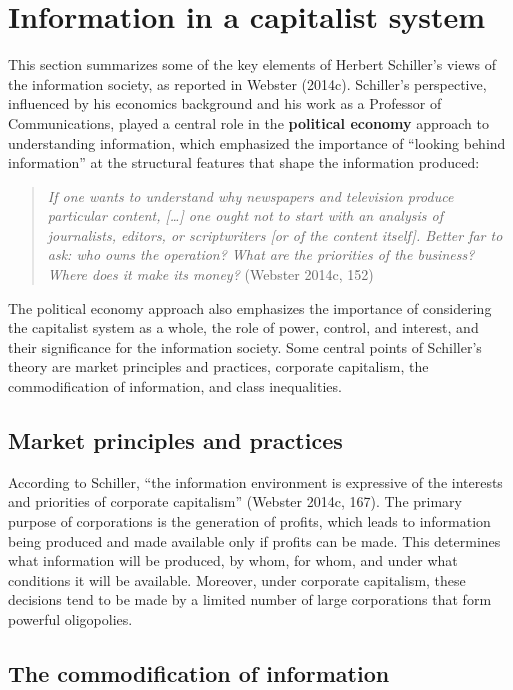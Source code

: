 \documentclass[
  letterpaper,
  DIV=11,
  numbers=noendperiod]{scrreprt}
\begin{document}
\section{Information in a capitalist
system}\label{information-in-a-capitalist-system}

This section summarizes some of the key elements of Herbert Schiller's
views of the information society, as reported in Webster (2014c).
Schiller's perspective, influenced by his economics background and his
work as a Professor of Communications, played a central role in the
\textbf{political economy} approach to understanding information, which
emphasized the importance of ``looking behind information'' at the
structural features that shape the information produced:

\begin{quote}
\emph{If one wants to understand why newspapers and television produce
particular content, {[}\ldots{]} one ought not to start with an analysis
of journalists, editors, or scriptwriters {[}or of the content
itself{]}. Better far to ask: who owns the operation? What are the
priorities of the business? Where does it make its money?} (Webster
2014c, 152)
\end{quote}

The political economy approach also emphasizes the importance of
considering the capitalist system as a whole, the role of power,
control, and interest, and their significance for the information
society. Some central points of Schiller's theory are market principles
and practices, corporate capitalism, the commodification of information,
and class inequalities.

\subsection{Market principles and
practices}\label{market-principles-and-practices}

According to Schiller, ``the information environment is expressive of
the interests and priorities of corporate capitalism'' (Webster 2014c,
167). The primary purpose of corporations is the generation of profits,
which leads to information being produced and made available only if
profits can be made. This determines what information will be produced,
by whom, for whom, and under what conditions it will be available.
Moreover, under corporate capitalism, these decisions tend to be made by
a limited number of large corporations that form powerful oligopolies.

\subsection{The commodification of
information}\label{the-commodification-of-information}
\end{document}
